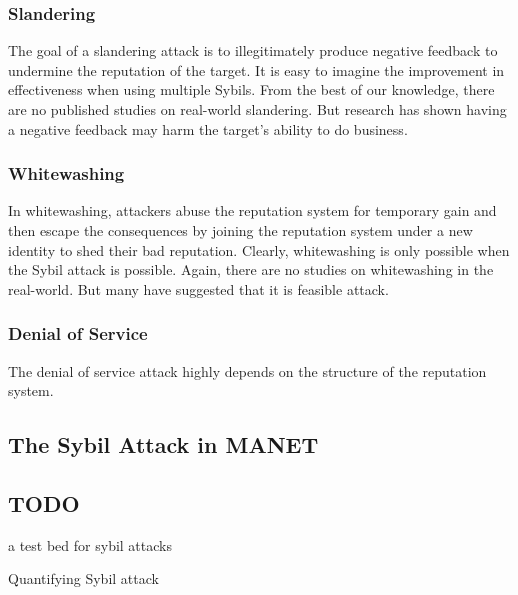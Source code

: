 \subsubsection{Slandering}
The goal of a slandering attack is to illegitimately produce negative feedback
to undermine the reputation of the target. It is easy to imagine the improvement
in effectiveness when using multiple Sybils. From the best of our knowledge,
there are no published studies on real-world slandering. But
research has shown having a negative feedback may harm the target's ability to
do business\cite{ba2002evidence}.

\subsubsection{Whitewashing}
In whitewashing, attackers abuse the reputation system for temporary gain and
then escape the consequences by joining the reputation system under a new
identity to shed their bad reputation. Clearly, whitewashing is only possible
when the Sybil attack is possible. Again, there are no studies on whitewashing
in the real-world. But many have suggested that it is feasible
attack\cite{hoffman2009survey, marti2006taxonomy}.

\subsubsection{Denial of Service}
The denial of service attack highly depends on the structure of the reputation
system. 

\subsection{The Sybil Attack in MANET}

\subsection{TODO}
a test bed for sybil attacks\cite{irissappane2012towards}

Quantifying Sybil attack\cite{margolin2008quantifying}

